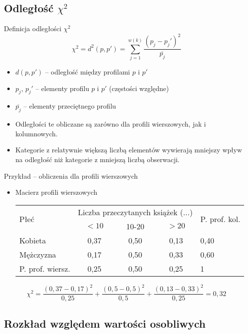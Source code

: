 \documentclass{beamer}
\begin{document}
\begin{frame}{}
\begin{scriptsize}
\begin{itemize}
\end{itemize}
\end{scriptsize}
\end{frame}



\subsection{Odległość $\chi^2$}

\begin{frame}{Definicja odległości $\chi^2$}
  $$\chi^2 = d^2(p,p') = \sum_{j=1}^{w(k)} \frac{(p_j-p_j')^2}{\bar{p_j}} $$
  \begin{itemize}
  \item $d(p,p')$ -- odległość między profilami $p$ i $p'$
  \item $p_j$, $p_j'$ -- elementy profilu $p$ i $p'$ (częstości względne)
  \item $\bar{p_j}$ -- elementy przeciętnego profilu
  \item Odległości te obliczane są zarówno dla profili wierszowych, jak i kolumnowych.
  \item Kategorie z relatywnie większą liczbą elementów wywierają mniejszy wpływ na odległość niż kategorie z mniejszą liczbą obserwacji.
  \end{itemize}
\end{frame}

\begin{frame}{Przykład -- obliczenia dla profili wierszowych}
  \begin{itemize}
  \item Macierz profili wierszowych
\begin{tabular}{|p{2cm}|c|c|c|p{2cm}|}\hline
\multirow{2}{*}{Płeć} & \multicolumn{3}{|c|}{Liczba przeczytanych książek (...)}& \multirow{2}{*}{P. prof. kol.}\\
& $<10$ & 10-20 & $>20$ & \\ \hline
Kobieta & 0,37 & 0,50 & 0,13 & 0,40\\\hline
Mężczyzna & 0,17 & 0,50 & 0,33 & 0,60\\\hline
P. prof. wiersz. & 0,25 & 0,50 & 0,25 & 1\\\hline
\end{tabular}
  \end{itemize}
  $$\chi^2 = \frac{(0,37-0,17)^2}{0,25} + \frac{(0,5-0,5)^2}{0,5} + \frac{(0,13-0,33)^2}{0,25}=0,32 $$
\end{frame}

\subsection{Rozkład względem wartości osobliwych}
\end{document}
